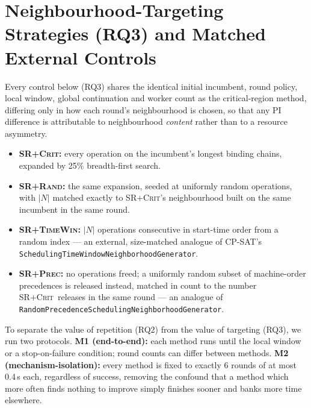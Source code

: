 \documentclass[letterpaper]{article} %
\newcommand{\crit}{\textsc{SR+Crit}}
\newcommand{\rnd}{\textsc{SR+Rand}}
\newcommand{\tw}{\textsc{SR+TimeWin}}
\newcommand{\precn}{\textsc{SR+Prec}}
\begin{document}
\section{Neighbourhood-Targeting Strategies (RQ3) and Matched External Controls}
\label{sec:lns}

Every control below (RQ3) shares the identical initial incumbent, round policy, local window, global continuation and worker count as the critical-region method, differing only in how each round's neighbourhood is chosen, so that any PI difference is attributable to neighbourhood \emph{content} rather than to a resource asymmetry.
\begin{itemize}
\item \textbf{\crit:} every operation on the incumbent's longest binding chains, expanded by 25\% breadth-first search.
\item \textbf{\rnd:} the same expansion, seeded at uniformly random operations, with $|N|$ matched exactly to \crit's neighbourhood built on the same incumbent in the same round.
\item \textbf{\tw:} $|N|$ operations consecutive in start-time order from a random index --- an external, size-matched analogue of CP-SAT's \texttt{SchedulingTime\-Window\-Neighborhood\-Generator}.
\item \textbf{\precn:} no operations freed; a uniformly random subset of machine-order precedences is released instead, matched in count to the number \crit\ releases in the same round --- an analogue of \texttt{Random\-Precedence\-Scheduling\-Neighborhood\-Generator}.
\end{itemize}
To separate the value of repetition (RQ2) from the value of targeting (RQ3), we run two protocols. \textbf{M1 (end-to-end):} each method runs until the local window or a stop-on-failure condition; round counts can differ between methods. \textbf{M2 (mechanism-isolation):} every method is fixed to exactly 6 rounds of at most 0.4\,s each, regardless of success, removing the confound that a method which more often finds nothing to improve simply finishes sooner and banks more time elsewhere.
\end{document}
